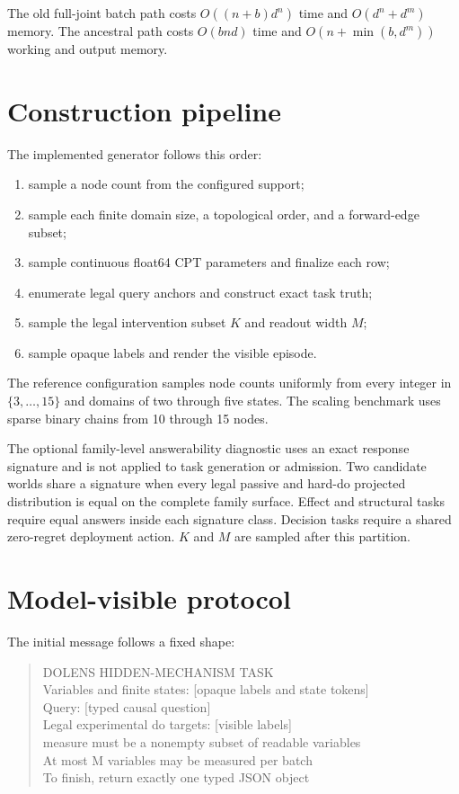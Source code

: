 \documentclass{article}
\begin{document}
The old full-joint batch path costs $O((n+b)d^n)$ time and
$O(d^n+d^m)$ memory. The ancestral path costs $O(bnd)$ time and
$O(n+\min(b,d^m))$ working and output memory.

\section{Construction pipeline}

The implemented generator follows this order:
\begin{enumerate}[leftmargin=1.6em,itemsep=2pt]
  \item sample a node count from the configured support;
  \item sample each finite domain size, a topological order, and a forward-edge
        subset;
  \item sample continuous float64 CPT parameters and finalize each row;
  \item enumerate legal query anchors and construct exact task truth;
  \item sample the legal intervention subset $K$ and readout width $M$;
  \item sample opaque labels and render the visible episode.
\end{enumerate}
The reference configuration samples node counts uniformly from every integer in
$\{3,\ldots,15\}$ and domains of two through five states. The scaling benchmark
uses sparse binary chains from 10 through 15 nodes.

The optional family-level answerability diagnostic uses an exact response
signature and is not applied to task generation or admission. Two candidate
worlds share a signature when every legal passive and hard-do projected
distribution is equal on the complete family surface. Effect and structural
tasks require equal answers inside each signature class. Decision tasks require a shared zero-regret
deployment action. $K$ and $M$ are sampled after this partition.

\section{Model-visible protocol}

The initial message follows a fixed shape:
\begin{quote}\small\ttfamily\raggedright
DOLENS HIDDEN-MECHANISM TASK\\
Variables and finite states: [opaque labels and state tokens]\\
Query: [typed causal question]\\
Legal experimental do targets: [visible labels]\\
measure must be a nonempty subset of readable variables\\
At most M variables may be measured per batch\\
To finish, return exactly one typed JSON object
\end{quote}
\end{document}
